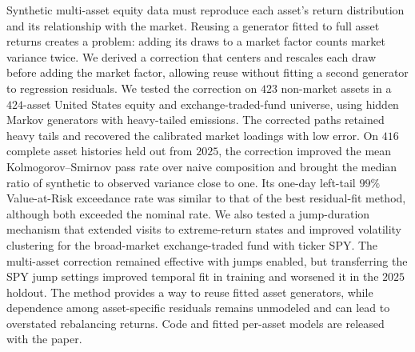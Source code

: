 Synthetic multi-asset equity data must reproduce each asset's return
distribution and its relationship with the market. Reusing a generator
fitted to full asset returns creates a problem: adding its draws to a
market factor counts market variance twice. We derived a correction
that centers and rescales each draw before adding the market factor,
allowing reuse without fitting a second generator to regression
residuals. We tested the correction on $423$ non-market assets in a
$424$-asset United States equity and exchange-traded-fund universe,
using hidden Markov generators with heavy-tailed emissions. The
corrected paths retained heavy tails and recovered the calibrated
market loadings with low error. On $416$ complete asset histories held
out from $2025$, the correction improved the mean Kolmogorov--Smirnov
pass rate over naive composition and brought the median ratio of
synthetic to observed variance close to one. Its one-day left-tail
$99\%$ Value-at-Risk exceedance rate was similar to that of the best
residual-fit method, although both exceeded the nominal rate. We also
tested a jump-duration mechanism that extended visits to extreme-return
states and improved volatility clustering for the broad-market
exchange-traded fund with ticker SPY. The multi-asset correction
remained effective with jumps enabled, but transferring the SPY jump
settings improved temporal fit in training and worsened it in the
$2025$ holdout. The method provides a way to reuse fitted asset
generators, while dependence among asset-specific residuals remains
unmodeled and can lead to overstated rebalancing returns. Code and
fitted per-asset models are released with the paper.
